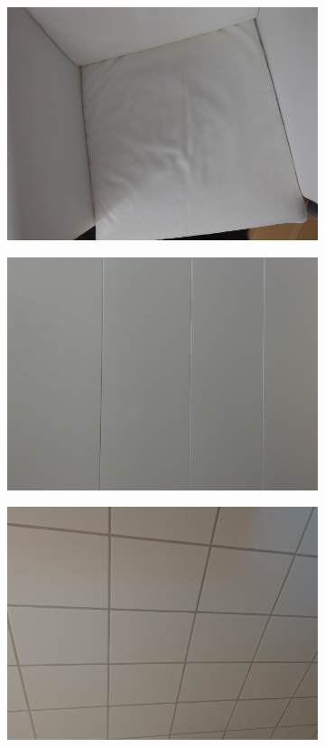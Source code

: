 \begin{figure}[h!tb]
    \begin{subfigure}[b]{0.25\textwidth}
        \centering
        \includegraphics[width=0.9\linewidth]{images/materials/leather-cam}
    \end{subfigure}%
    \begin{subfigure}[b]{0.25\textwidth}
        \centering
        \includegraphics[width=0.9\linewidth]{images/materials/whiteFurniture-cam}
    \end{subfigure}%
    \begin{subfigure}[b]{0.25\textwidth}
        \centering
        \includegraphics[width=0.9\linewidth]{images/materials/tiles-cam}

\end{subfigure}
\end{figure}
